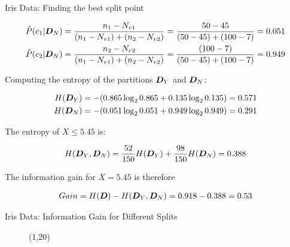 \begin{frame}{Iris Data: Finding the best split point}

    \begin{align*}
        \hat{P}(c_1|{\boldsymbol D}_N) & =
        {n_1 - N_{v1} \over (n_1 - N_{v1})+(n_2 - N_{v2})}
        = {50-45 \over (50-45)+(100-7)} = 0.051\\
        \hat{P}(c_2|{\boldsymbol D}_N) & =
        {n_2 - N_{v2} \over (n_1 - N_{v1})+(n_2 - N_{v2})}
        = {(100-7) \over (50-45)+(100-7)} = 0.949
    \end{align*}

    Computing the entropy of the partitions ${\boldsymbol D}_Y$ and ${\boldsymbol D}_N$:

    \begin{align*}
        H({\boldsymbol D}_Y) & = -(0.865 \log_2 0.865 + 0.135 \log_2 0.135) =
        0.571\\
        H({\boldsymbol D}_N) & = -(0.051 \log_2 0.051 + 0.949 \log_2 0.949) =
        0.291
    \end{align*}

    The entropy of $X \le 5.45$ is:

    \begin{align*}
        H({\boldsymbol D}_Y,{\boldsymbol D}_N) = {52 \over 150} H({\boldsymbol D}_Y) + {98 \over 150}
        H({\boldsymbol D}_N) = 0.388
    \end{align*}

    The information gain for $X=5.45$ is therefore

    \begin{align*}
        Gain = H({\boldsymbol D}) - H({\boldsymbol D}_Y,{\boldsymbol D}_N) = 0.918 - 0.388 = 0.53
    \end{align*}


\end{frame}

\begin{frame}{Iris Data: Information Gain for Different Splits}
\begin{figure}[!t]
    \pstScalePoints(1,20){}{}
    \centerline{
    \hspace{0.5in}
    }
\end{figure}
\end{frame}



